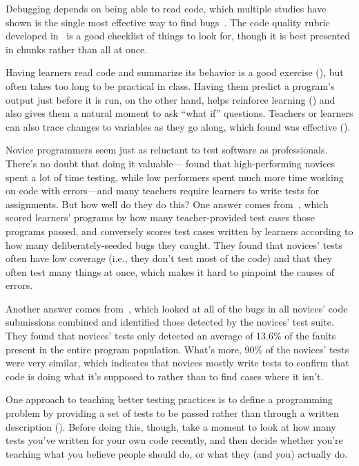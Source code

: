 Debugging depends on being able to read code,
which multiple studies have shown is the single most effective way to find bugs~\cite{Basi1987,Keme2009,Bacc2013}.
The code quality rubric developed in~\cite{Steg2014,Steg2016a}
is a good checklist of things to look for,
though it is best presented in chunks rather than all at once.

Having learners read code and summarize its behavior is a good exercise (),
but often takes too long to be practical in class.
Having them predict a program's output just before it is run,
on the other hand,
helps reinforce learning ()
and also gives them a natural moment to ask ``what if'' questions.
Teachers or learners can also trace changes to variables as they go along,
which \cite{Cunn2017} found was effective ().


Novice programmers seem just as reluctant to test software as professionals.
There's no doubt that doing it valuable---\cite{Cart2017} found that
high-performing novices spent a lot of time testing,
while low performers spent much more time working on code with errors---and many teachers
require learners to write tests for assignments.
But how well do they do this?
One answer comes from~\cite{Bria2015},
which scored learners' programs by how many teacher-provided test cases those programs passed,
and conversely scores test cases written by learners according to how many deliberately-seeded bugs they caught.
They found that novices' tests often have low coverage (i.e., they don't test most of the code)
and that they often test many things at once, which makes it hard to pinpoint the causes of errors.

Another answer comes from~\cite{Edwa2014b},
which looked at all of the bugs in all novices' code submissions combined
and identified those detected by the novices' test suite.
They found that novices' tests only detected an average of 13.6\% of the faults present in the entire program population.
What's more,
90\% of the novices' tests were very similar,
which indicates that novices mostly write tests to confirm that code is doing what it's supposed to
rather than to find cases where it isn't.

One approach to teaching better testing practices is
to define a programming problem by providing a set of tests to be passed
rather than through a written description ().
Before doing this,
though,
take a moment to look at how many tests you've written for your own code recently,
and then decide whether you're teaching what you believe people should do,
or what they (and you) actually do.


